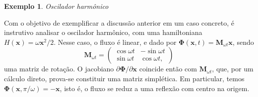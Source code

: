\documentclass[
	12pt,
	oneside,			%
	a4paper,			%
	english,			%
	brazil				%
	]{abntex2}
\theoremstyle{definition}
\newtheorem{exmp}{Exemplo}[chapter]
\begin{document}
\begin{exmp} 
\textit{Oscilador harmônico}

Com o objetivo de exemplificar a discussão anterior em um caso concreto, é instrutivo analisar o oscilador harmônico, com uma hamiltoniana $H(\mathbf{x}) = \omega \mathbf{x}^2/2$. Nesse caso, o fluxo é linear, e dado por $\boldsymbol{\Phi} \left( \mathbf{x},t \right) = \mathbf{M}_{\omega t} \mathbf{x}$, sendo
\begin{equation}
    \mathbf{M}_{\omega t} = \begin{pmatrix} \cos \omega t & -\sin \omega t \\ \sin \omega t & \cos \omega t,
    \end{pmatrix}
\end{equation}
uma matriz de rotação. O jacobiano $\partial \boldsymbol{\Phi}/\partial \mathbf{x}$ coincide então com $\mathbf{M}_{\omega t}$, que, por um cálculo direto, prova-se constituir uma matriz simplética. Em particular, temos $\boldsymbol{\Phi} \left( \mathbf{x}, \pi/\omega \right) = -\mathbf{x}$, isto é, o fluxo se reduz a uma reflexão com centro na origem.

\end{exmp}
\end{document}
